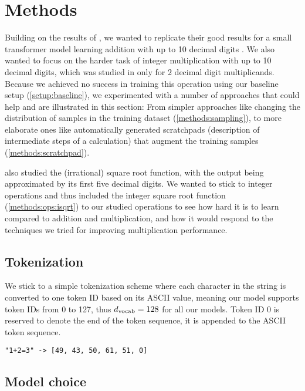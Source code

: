 \section{Methods}
\label{methods}

Building on the results of \cite{teaching}, we wanted to replicate their good results for a small transformer model learning addition with up to 10 decimal digits .
We also wanted to focus on the harder task of integer multiplication with up to 10 decimal digits, which was studied in \cite{teaching} only for 2 decimal digit multiplicands.
Because we achieved no success in training this operation using our baseline setup (\cref{setup:baseline}), we experimented with a number of approaches that could help and are illustrated in this section: From simpler approaches like changing the distribution of samples in the training dataset (\cref{methods:sampling}), to more elaborate ones like automatically generated scratchpads (description of intermediate steps of a calculation) that augment the training samples (\cref{methods:scratchpad}).

\cite{teaching} also studied the (irrational) square root function, with the output being approximated by its first five decimal digits. We wanted to stick to integer operations and thus included the integer square root function (\cref{methods:ops:isqrt}) to our studied operations to see how hard it is to learn compared to addition and multiplication, and how it would respond to the techniques we tried for improving multiplication performance.

\subsection{Tokenization}
\label{methods:token}

We stick to a simple tokenization scheme where each character in the string is converted to one token ID based on its ASCII value, meaning our model supports token IDs from 0 to 127, thus ${d_\textrm{vocab}}=128$ for all our models. Token ID 0 is reserved to denote the end of the token sequence, it is appended to the ASCII token sequence.

\begin{lstlisting}
"1+2=3" -> [49, 43, 50, 61, 51, 0]
\end{lstlisting}


\subsection{Model choice}
\label{methods:model}

